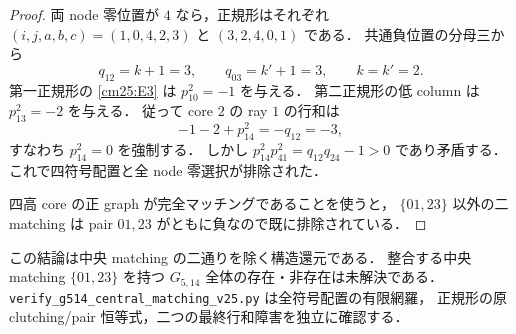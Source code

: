 \begin{proof}
両 node 零位置が $4$ なら，正規形はそれぞれ
$(i,j,a,b,c)=(1,0,4,2,3)$ と $(3,2,4,0,1)$ である．
共通負位置の分母三から
\[
 q_{12}=k+1=3,\qquad q_{03}=k'+1=3,
 \qquad k=k'=2.
\]
第一正規形の \eqref{cm25:E3} は $p^2_{10}=-1$ を与える．
第二正規形の低 column は $p^2_{13}=-2$ を与える．
従って core $2$ の ray $1$ の行和は
\[
 -1-2+p^2_{14}=-q_{12}=-3,
\]
すなわち $p^2_{14}=0$ を強制する．
しかし $p^2_{14}p^2_{41}=q_{12}q_{24}-1>0$ であり矛盾する．
これで四符号配置と全 node 零選択が排除された．

四高 core の正 graph が完全マッチングであることを使うと，
$\{01,23\}$ 以外の二 matching は pair $01,23$ がともに負なので既に排除されている．
\end{proof}

この結論は中央 matching の二通りを除く構造還元である．
整合する中央 matching $\{01,23\}$ を持つ $G_{5,14}$ 全体の存在・非存在は未解決である．
\nolinkurl{verify_g514_central_matching_v25.py} は全符号配置の有限網羅，
正規形の原 clutching/pair 恒等式，二つの最終行和障害を独立に確認する．
